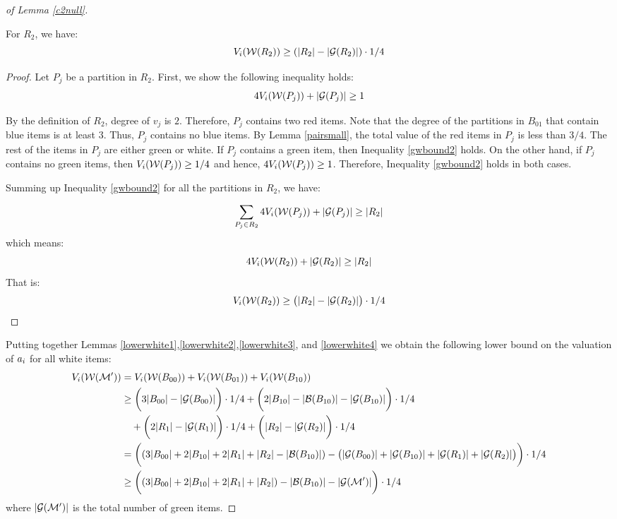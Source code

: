 \begin{proof}[of Lemma \ref{c2null}]
\begin{lemma}
\label{lowerwhite4}
For $R_2$, we have: $$ V_i(\mathcal{W}(R_2)) \geq (|R_2| - |{\mathcal{G}}(R_2)|)\cdot 1/4 $$
\end{lemma}
\begin{proof}
Let $P_j$ be a partition in $R_2$. First, we show the following inequality holds:
\begin{equation}
\label{gwbound2}
4V_i(\mathcal{W}(P_j)) + |{\mathcal G}(P_j)| \geq 1
\end{equation}

By the definition of $R_2$, degree of $v_j$ is $2$. Therefore, $P_j$ contains two red items. Note that the degree of the partitions in $B_{01}$ that contain blue items is at least $3$. Thus, $P_j$ contains no blue items. By Lemma \ref{pairsmall}, the total value of the red items in $P_j$ is less than $3/4$. The rest of the items in $P_j$ are either green or white. If $P_j$ contains a green item, then Inequality \eqref{gwbound2} holds. On the other hand, if $P_j$ contains no green items, then $V_i(\mathcal{W}(P_j)) \geq 1/4$ and hence, $4V_i(\mathcal{W}(P_j)) \geq 1$. Therefore, Inequality \eqref{gwbound2} holds in both cases. 

Summing up Inequality \eqref{gwbound2} for all the partitions in $R_2$, we have:

$$
\sum_{P_j \in R_2} 4V_i(\mathcal{W}(P_j)) + |{\mathcal G}(P_j)| \geq |R_2|
$$
which means:
$$
4V_i(\mathcal{W}(R_2)) + |{\mathcal G}(R_2)| \geq |R_2|
$$
That is:
$$
V_i(\mathcal{W}(R_2)) \geq \big(|R_2| - |{\mathcal G}(R_2)|\big)\cdot 1/4  
$$
\end{proof}

Putting together Lemmas \ref{lowerwhite1},\ref{lowerwhite2},\ref{lowerwhite3}, and \ref{lowerwhite4} we obtain the following lower bound on the valuation of $a_i$ for all white items:
\begin{equation}\label{w1}
\begin{split}
V_i(\mathcal{W}(\mathcal{M}')) & = V_i(\mathcal{W}(B_{00})) + V_i(\mathcal{W}(B_{01})) + V_i(\mathcal{W}(B_{10}))\\
& \geq \bigg(3|B_{00}| - |{\mathcal{G}}(B_{00})|\bigg)\cdot 1/4 + \bigg(2|B_{10}| - |{\mathcal{B}}(B_{10})| - |{\mathcal{G}}(B_{10})|\bigg)\cdot 1/4 \\ & \hspace{10pt}+ \bigg(2|R_1| - |{\mathcal{G}}(R_1)|\bigg)\cdot 1/4 + \bigg(|R_2| - |{\mathcal{G}}(R_2)|\bigg)\cdot 1/4\\
&= \bigg((3|B_{00}| + 2|B_{10}| + 2|R_1| + |R_2| - |{\mathcal{B}}(B_{10})|) - \big(|{\mathcal{G}}(B_{00})| + |{\mathcal{G}}(B_{10})| + |{\mathcal{G}}(R_1)| + |{\mathcal{G}}(R_2)|\big) \bigg)\cdot 1/4\\
& \geq \bigg((3|B_{00}| + 2|B_{10}| + 2|R_1| + |R_2| )- |{\mathcal{B}}(B_{10})| -  |{\mathcal{G}}(\mathcal{M}')| \bigg)\cdot 1/4
\end{split}
\end{equation}
where $|{\mathcal{G}}(\mathcal{M}')|$ is the total number of green items. 




\end{proof}

